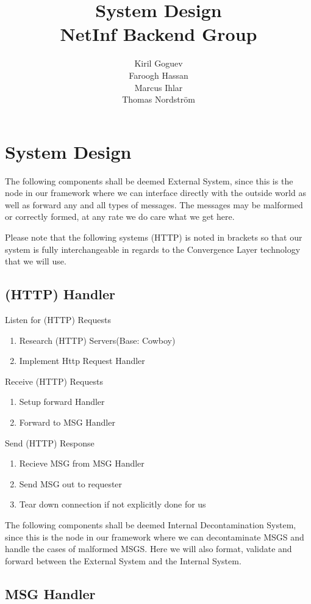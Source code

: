 \documentclass[11pt]{report}
\title{\textbf{System Design}\\ NetInf Backend Group}
\author{Kiril Goguev\\
Faroogh Hassan\\
Marcus Ihlar\\
Thomas Nordström\\}
\date{}
\begin{document}
\maketitle

\tableofcontents

\chapter{System Design}

 The following components shall be deemed External System, since this is the node in our framework where we can interface directly with the outside world as well as forward any and all types of messages. The messages may be malformed or correctly formed, at any rate we do care what we get here.
 
Please note that the following systems (HTTP) is noted in brackets so that our system is fully interchangeable in regards to the Convergence Layer technology that we will use. 

\section{(HTTP) Handler}
Listen for (HTTP) Requests
\begin{enumerate}
\item Research (HTTP) Servers(Base: Cowboy)
\item Implement Http Request Handler
\end{enumerate}
Receive (HTTP) Requests
\begin{enumerate}
\item Setup forward Handler
\item Forward to MSG Handler
\end{enumerate}
Send (HTTP) Response
\begin{enumerate}
\item Recieve MSG from MSG Handler
\item Send MSG out to requester
\item Tear down connection if not explicitly done for us
\end{enumerate}

The following components shall be deemed Internal Decontamination System, since this is the node in our framework where we can decontaminate MSGS and handle the cases of malformed MSGS. Here we will also format, validate and forward between the External System and the Internal System.

\section{MSG Handler}
\end{document}
